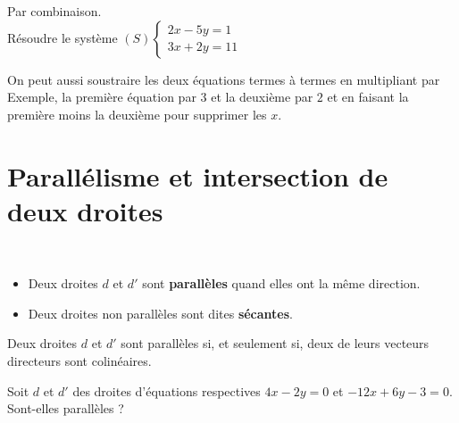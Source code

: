 \begin{Méthode}Par combinaison. \\

Résoudre le système 
$(S)\left\{
    \begin{array}{ll}
     2x-5y=1    & \\
       3x+2y=11 & 
    \end{array}
\right.$ 
\vspace{0.3cm}

\ligne

\ligne

\ligne

\ligne

\ligne

\ligne

\ligne

\ligne

\ligne

\begin{Remarque}
On peut aussi soustraire les deux équations termes à termes en multipliant par Exemple, la première équation par $3$ et la deuxième par $2$ et en faisant la première moins la deuxième pour supprimer les $x$.
\end{Remarque}

\end{Méthode}
\newpage

\section{Parallélisme et intersection de deux droites}

\begin{Définition}$ $ 
\begin{itemize}[label=\textcolor{Couleur6}{$\bullet$}]
\item Deux droites $d$ et $d'$ sont {\bf{parallèles}} quand elles ont la même direction.
\item Deux droites non parallèles sont dites {\bf{sécantes}}.
\end{itemize}

\end{Définition}



\begin{Propriété}
Deux droites $d$ et $d'$ sont parallèles si, et seulement si, deux de leurs vecteurs directeurs sont colinéaires.
\end{Propriété}

\begin{Exemple}
Soit $d$ et $d'$ des droites d'équations respectives $4x-2y=0$ et $-12x+6y-3=0$. Sont-elles parallèles ?
\vspace{0.1cm}

\ligne

\ligne

\ligne

\ligne

\ligne

\end{Exemple}

